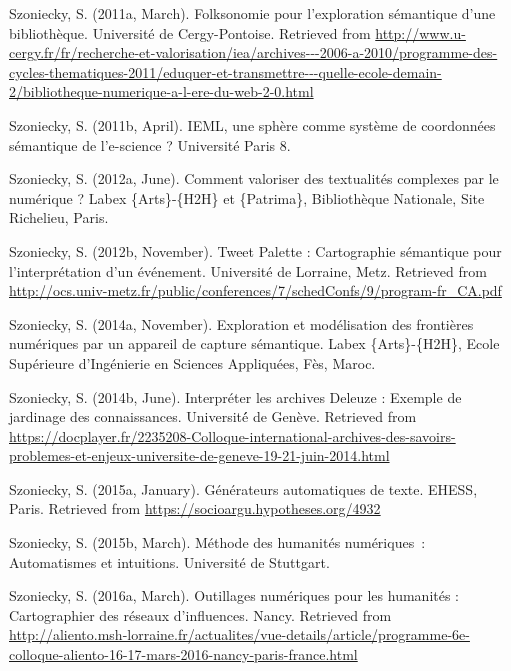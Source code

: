 \documentclass[
  a4paper,
  DIV=11,
  numbers=noendperiod]{scrreprt}
\newlength{\cslhangindent}
\newenvironment{CSLReferences}[2] %
 {\begin{list}{}{%
  \setlength{\itemindent}{0pt}
  \setlength{\leftmargin}{0pt}
  \setlength{\parsep}{0pt}
  \ifodd #1
   \setlength{\leftmargin}{\cslhangindent}
   \setlength{\itemindent}{-1\cslhangindent}
  \fi
  \setlength{\itemsep}{#2\baselineskip}}}
 {\end{list}}
\begin{document}
\begin{CSLReferences}{1}{0}
Szoniecky, S. (2011a, March). Folksonomie pour l'exploration sémantique
d'une bibliothèque. Université de Cergy-Pontoise. Retrieved from
\url{http://www.u-cergy.fr/fr/recherche-et-valorisation/iea/archives---2006-a-2010/programme-des-cycles-thematiques-2011/eduquer-et-transmettre---quelle-ecole-demain-2/bibliotheque-numerique-a-l-ere-du-web-2-0.html}

Szoniecky, S. (2011b, April). {IEML}, une sphère comme système de
coordonnées sémantique de l'e-science ? Université Paris 8.

Szoniecky, S. (2012a, June). Comment valoriser des textualités complexes
par le numérique ? Labex \{Arts\}-\{H2H\} et \{Patrima\}, Bibliothèque
Nationale, Site Richelieu, Paris.

Szoniecky, S. (2012b, November). Tweet {Palette} : Cartographie
sémantique pour l'interprétation d'un événement. Université de Lorraine,
Metz. Retrieved from
\url{http://ocs.univ-metz.fr/public/conferences/7/schedConfs/9/program-fr_CA.pdf}

Szoniecky, S. (2014a, November). Exploration et modélisation des
frontières numériques par un appareil de capture sémantique. Labex
\{Arts\}-\{H2H\}, Ecole Supérieure d'Ingénierie en Sciences Appliquées,
Fès, Maroc.

Szoniecky, S. (2014b, June). Interpréter les archives {Deleuze} :
Exemple de jardinage des connaissances. Université́ de Genève. Retrieved
from
\url{https://docplayer.fr/2235208-Colloque-international-archives-des-savoirs-problemes-et-enjeux-universite-de-geneve-19-21-juin-2014.html}

Szoniecky, S. (2015a, January). Générateurs automatiques de texte.
EHESS, Paris. Retrieved from \url{https://socioargu.hypotheses.org/4932}

Szoniecky, S. (2015b, March). Méthode des humanités numériques~:
Automatismes et intuitions. Université de Stuttgart.

Szoniecky, S. (2016a, March). Outillages numériques pour les humanités :
Cartographier des réseaux d'influences. Nancy. Retrieved from
\url{http://aliento.msh-lorraine.fr/actualites/vue-details/article/programme-6e-colloque-aliento-16-17-mars-2016-nancy-paris-france.html}


\end{CSLReferences}
\end{document}

